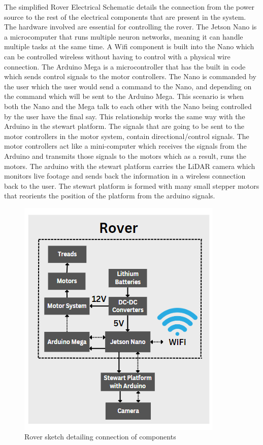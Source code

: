\documentclass[a4paper, 10pt]{article}
\begin{document}
		
		The simplified Rover Electrical Schematic details the connection from the power source to the rest of the electrical components that are present in the system. The hardware involved are essential for controlling the rover. The Jetson Nano is a microcomputer that runs multiple neuron networks, meaning it can handle multiple tasks at the same time. A Wifi component is built into the Nano which can be controlled wireless without having to control with a physical wire connection. The Arduino Mega is a microcontroller that has the built in code which sends control signals to the motor controllers. The Nano is commanded by the user which the user would send a command to the Nano, and depending on the command which will be sent to the Arduino Mega. This scenario is when both the Nano and the Mega talk to each other with the Nano being controlled by the user have the final say. This relationship works the same way with the Arduino in the stewart platform. The signals that are going to be sent to the motor controllers in the motor system, contain directional/control signals. The motor controllers act like a mini-computer which receives the signals from the Arduino and transmits those signals to the motors which as a result, runs the motors. The arduino with the stewart platform carries the LiDAR camera which monitors live footage and sends back the information in a wireless connection back to the user. The stewart platform is formed with many small stepper motors that reorients the position of the platform from the arduino signals.  
		
		\begin{figure} [!h]
			\centering
			\includegraphics[scale=0.8]{Photos/Rover schematic simplified}
			\caption{Rover sketch detailing connection of components}
			\label{rover_schema}
		\end{figure}
\end{document}
